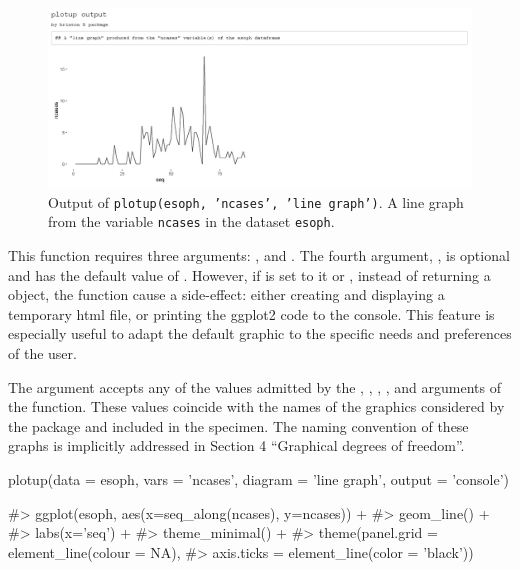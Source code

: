 \begin{Schunk}
	\begin{figure}[H]
\includegraphics[width=0.90\linewidth]{figures/plotup_esoph_ncases_linegraph} \caption[Output of 'plotup(esoph, 'ncases', 'line graph', 'html')']{Output of \texttt{plotup(esoph, 'ncases', 'line graph')}. A line graph from the variable \texttt{ncases} in the dataset \texttt{esoph}.}\label{fig:plotupesophncaseslinegraph}
	\end{figure}
\end{Schunk}

This function requires three arguments: ,  and
. The fourth argument, , is optional and has
the default value of . However, if is set to it
 or , instead of returning a
 object, the function cause a side-effect:
either creating and displaying a temporary html file, or printing the
ggplot2 code to the console. This feature is especially useful to adapt
the default graphic to the specific needs and preferences of the user.

The  argument accepts any of the values admitted by the
, , , ,
 and  arguments of the 
function. These values coincide with the names of the graphics considered by the package and included in the specimen. The naming convention of these graphs is implicitly addressed in Section 4 ``Graphical degrees of freedom''.

\begin{example}
  plotup(data = esoph, vars = 'ncases', diagram = 'line graph', 
         output = 'console')
\end{example}

\begin{Schunk}
	\begin{Soutput}
#> ggplot(esoph, aes(x=seq_along(ncases), y=ncases)) +
#>   geom_line() +
#>   labs(x='seq') +
#>   theme_minimal() +
#>   theme(panel.grid = element_line(colour = NA),
#>     axis.ticks = element_line(color = 'black'))
	\end{Soutput}
\end{Schunk}



